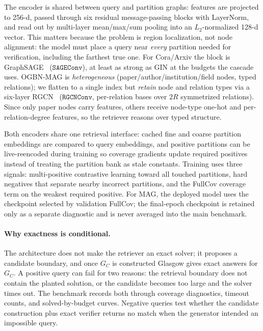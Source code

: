 \documentclass[runningheads]{llncs}
\begin{document}
The encoder is shared between query and partition graphs: features are projected to 256-d, passed through six residual message-passing blocks with LayerNorm, and read out by multi-layer mean/max/sum pooling into an $L_2$-normalized 128-d vector. This matters because the problem is region localization, not node alignment: the model must place a query near \emph{every} partition needed for verification, including the farthest true one. For Cora/Arxiv the block is GraphSAGE~\cite{ref_graphsage} ($\mathtt{SAGEConv}$), at least as strong as GIN at the budgets the cascade uses. OGBN-MAG is \emph{heterogeneous} (paper/author/institution/field nodes, typed relations); we flatten to a single index but \emph{retain} node and relation types via a six-layer RGCN~\cite{ref_rgcn} ($\mathtt{RGCNConv}$, per-relation bases over $2R$ symmetrized relations). Since only paper nodes carry features, others receive node-type one-hot and per-relation-degree features, so the retriever reasons over typed structure.

Both encoders share one retrieval interface: cached fine and coarse partition embeddings are compared to query embeddings, and positive partitions can be live-reencoded during training so coverage gradients update required positives instead of treating the partition bank as stale constants. Training uses three signals: multi-positive contrastive learning toward all touched partitions, hard negatives that separate nearby incorrect partitions, and the FullCov coverage term on the weakest required positive. For MAG, the deployed model uses the checkpoint selected by validation FullCov; the final-epoch checkpoint is retained only as a separate diagnostic and is never averaged into the main benchmark.

\paragraph{Why exactness is conditional.}
The architecture does not make the retriever an exact solver; it proposes a candidate boundary, and once $G_C$ is constructed Glasgow gives exact answers for $G_C$. A positive query can fail for two reasons: the retrieval boundary does not contain the planted solution, or the candidate becomes too large and the solver times out. The benchmark records both through coverage diagnostics, timeout counts, and solved-by-budget curves. Negative queries test whether the candidate construction plus exact verifier returns no match when the generator intended an impossible query.
\end{document}
